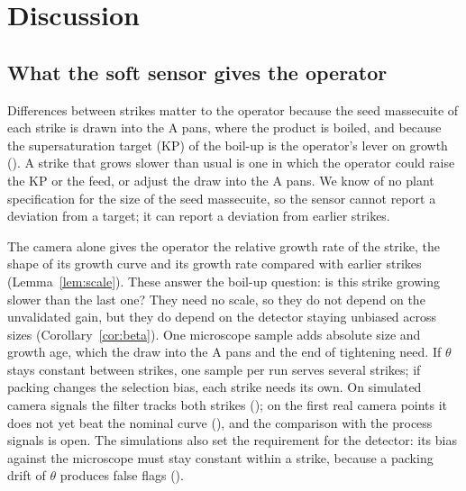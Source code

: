 \section{Discussion}\label{sec:discussion}

\subsection{What the soft sensor gives the operator}\label{sec:performs}

Differences between strikes matter to the operator because the seed massecuite of each strike is drawn into the A
pans, where the product is boiled, and because the supersaturation target (KP) of the boil-up is the operator's lever
on growth (). A strike that grows slower than usual is one in which the operator could raise the KP
or the feed, or adjust the draw into the A pans. We know of no plant specification for the size of the seed
massecuite, so the sensor cannot report a deviation from a target; it can report a deviation from earlier strikes.

The camera alone gives the operator the relative growth rate of the strike, the shape of its growth curve and its
growth rate compared with earlier strikes (Lemma~\ref{lem:scale}). These answer the boil-up question: is this strike
growing slower than the last one? They need no scale, so they do not depend on the unvalidated gain, but they do
depend on the detector staying unbiased across sizes (Corollary~\ref{cor:beta}). One microscope sample adds absolute
size and growth age, which the draw into the A pans and the end of tightening need. If $\theta$ stays constant between
strikes, one sample per run serves several strikes; if packing changes the selection bias, each strike needs its own.
On simulated camera signals the filter tracks both strikes (); on the first real camera points
it does not yet beat the nominal curve (), and the comparison with the process signals is open.
The simulations also set the requirement for the detector: its bias against the microscope must stay constant within
a strike, because a packing drift of $\theta$ produces false flags ().

